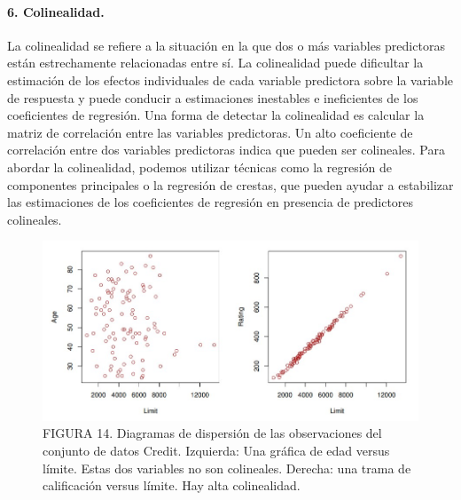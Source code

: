 \documentclass[
  letterpaper,
  DIV=11,
  numbers=noendperiod]{scrartcl}
\let\oldparagraph\paragraph
\renewcommand{\paragraph}[1]{\oldparagraph{#1}\mbox{}}
\begin{document}
\hypertarget{colinealidad.}{%
\paragraph{6. Colinealidad.}\label{colinealidad.}}

La colinealidad se refiere a la situación en la que dos o más variables
predictoras están estrechamente relacionadas entre sí. La colinealidad
puede dificultar la estimación de los efectos individuales de cada
variable predictora sobre la variable de respuesta y puede conducir a
estimaciones inestables e ineficientes de los coeficientes de regresión.
Una forma de detectar la colinealidad es calcular la matriz de
correlación entre las variables predictoras. Un alto coeficiente de
correlación entre dos variables predictoras indica que pueden ser
colineales. Para abordar la colinealidad, podemos utilizar técnicas como
la regresión de componentes principales o la regresión de crestas, que
pueden ayudar a estabilizar las estimaciones de los coeficientes de
regresión en presencia de predictores colineales.

\begin{figure}

{\centering \includegraphics{images/jh.jpg}

}

\caption{FIGURA 14. Diagramas de dispersión de las observaciones del
conjunto de datos Credit. Izquierda: Una gráfica de edad versus límite.
Estas dos variables no son colineales. Derecha: una trama de
calificación versus límite. Hay alta colinealidad.}

\end{figure}
\end{document}
